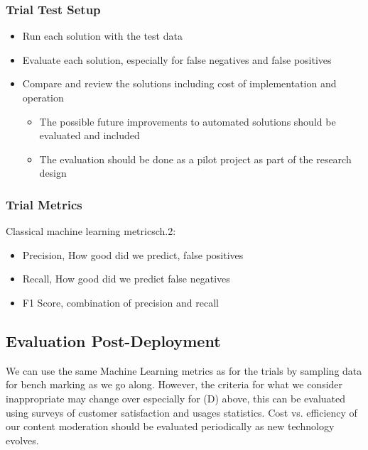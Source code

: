 \documentclass[
	letterpaper, %
	12pt, %
	unnumberedsections, %
	twoside, %
]{LTJournalArticle}
\begin{document}
\subsubsection*{Trial Test Setup}
\begin{itemize}
	\item Run each solution with the test data
	\item Evaluate each solution, especially for false negatives and false positives
	\item Compare and review the solutions including cost of implementation and operation
	      \begin{itemize}
		      \item The possible future improvements to automated solutions should be evaluated and included
		      \item The evaluation should be done as a pilot project as part of the research design
	      \end{itemize}
\end{itemize}

\subsubsection*{Trial Metrics}
Classical machine learning metrics\cite{ClarenceChio}ch.2:
\begin{itemize}
	\item Precision, How good did we predict, false positives
	\item Recall, How good did we predict false negatives
	\item F1 Score, combination of precision and recall
\end{itemize}

\subsection{Evaluation Post-Deployment}
We can use the same Machine Learning metrics as for the trials by sampling data for bench marking as we go along. However, the criteria for what we consider inappropriate may change over especially for (D) above, this can be evaluated using surveys of customer satisfaction and usages statistics. Cost vs. efficiency of our content moderation should be evaluated periodically as new technology evolves.
\end{document}
